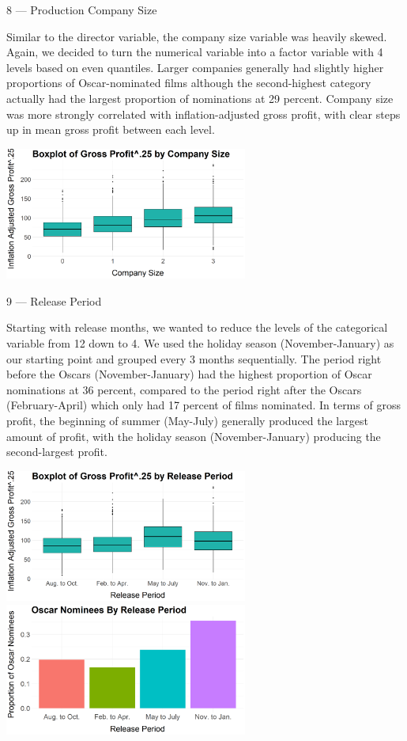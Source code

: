 \documentclass[10pt]{article}
\begin{document}
8 --- Production Company Size

Similar to the director variable, the company size variable was heavily skewed. Again, we decided to turn the numerical variable into a factor variable with 4 levels based on even quantiles. Larger companies generally had slightly higher proportions of Oscar-nominated films although the second-highest category actually had the largest proportion of nominations at 29 percent. Company size was more strongly correlated with inflation-adjusted gross profit, with clear steps up in mean gross profit between each level.

\begin{center}
\includegraphics[width=8cm]{_assets/_eda/co_size_iagp_bp.png}

\end{center}

9 --- Release Period

Starting with release months, we wanted to reduce the levels of the categorical variable from 12 down to 4. We used the holiday season (November-January) as our starting point and grouped every 3 months sequentially. The period right before the Oscars (November-January) had the highest proportion of Oscar nominations at 36 percent, compared to the period right after the Oscars (February-April) which only had 17 percent of films nominated. In terms of gross profit, the beginning of summer (May-July) generally produced the largest amount of profit, with the holiday season (November-January) producing the second-largest profit.

\begin{center}
\includegraphics[width=8cm]{_assets/_eda/releaseperiod_iagp_bp.png}
\hspace{1cm}
\includegraphics[width=8cm]{_assets/_eda/on_by_release_period.png}

\end{center}
\end{document}
